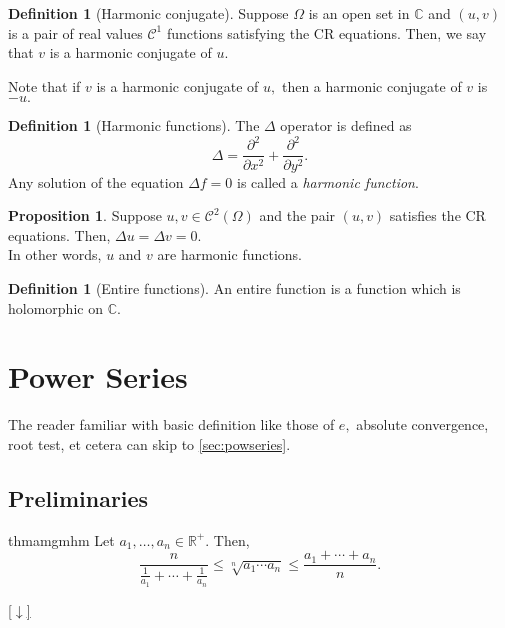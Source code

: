 \documentclass[12pt,oneside]{book}
\theoremstyle{definition}
\numberwithin{thm}{chapter}
\newtheorem{defn}[thm]{Definition}
\newtheorem{prop}[thm]{Proposition}
\newcommand{\downsym}{[$\downarrow$]}
\begin{document}
\begin{defn}[Harmonic conjugate]
	Suppose $\Omega$ is an open set in $\mathbb{C}$ and $(u, v)$ is a pair of real values $\mathcal{C}^1$ functions satisfying the CR equations. Then, we say that $v$ is a harmonic conjugate of $u.$
\end{defn}
Note that if $v$ is a harmonic conjugate of $u,$ then a harmonic conjugate of $v$ is $-u.$

\begin{defn}[Harmonic functions]
	The $\Delta$ operator is defined as
	\begin{equation*} 
		\Delta = \dfrac{\partial^2}{\partial x^2} + \dfrac{\partial^2}{\partial y^2}.
	\end{equation*}
	Any solution of the equation $\Delta f = 0$ is called a \emph{harmonic function}.
\end{defn}

\begin{prop}
	Suppose $u, v \in \mathcal{C}^2(\Omega)$ and the pair $(u, v)$ satisfies the CR equations. Then, $\Delta u = \Delta v = 0.$\\
	In other words, $u$ and $v$ are harmonic functions.
\end{prop}

\begin{defn}[Entire functions]
	An entire function is a function which is holomorphic on $\mathbb{C}.$
\end{defn}


\chapter{Power Series}
The reader familiar with basic definition like those of $e,$ absolute convergence, root test, et cetera can skip to \cref{sec:powseries}.
\section{Preliminaries}

\begin{restatable}[AM-GM-HM]{thm}{amgmhm}
\label{thm:amgmhm}
	Let $a_1, \ldots, a_n \in \mathbb{R}^+.$ Then,
	\begin{equation*} 
		\dfrac{n}{\frac{1}{a_1} + \cdots + \frac{1}{a_n}} \le \sqrt[n]{a_1\cdots a_n} \le \dfrac{a_1 + \cdots + a_n}{n}.
	\end{equation*}
\end{restatable}
\begin{flushright}\hyperref[thm:amgmhm2]{\downsym}\end{flushright}
\end{document}
